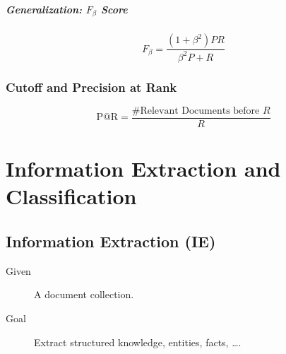             \paragraph{Generalization: \( F _ \beta \) Score}
            	\begin{equation*}
                	F _ \beta = \frac{(1 + \beta^2) P R}{\beta^2 P + R}
            	\end{equation*}

        \subsection{Cutoff and Precision at Rank} %
            \begin{equation*}
                \text{P@R} = \frac{\text{\#Relevant Documents before } R}{R} \tag{Precision at Rank}
            \end{equation*}

\chapter{Information Extraction and Classification} %
    \section{Information Extraction (IE)} %
        \begin{description}
        	\item[Given] A document collection.
        	\item[Goal] Extract structured knowledge, entities, facts, \dots.
        \end{description}

